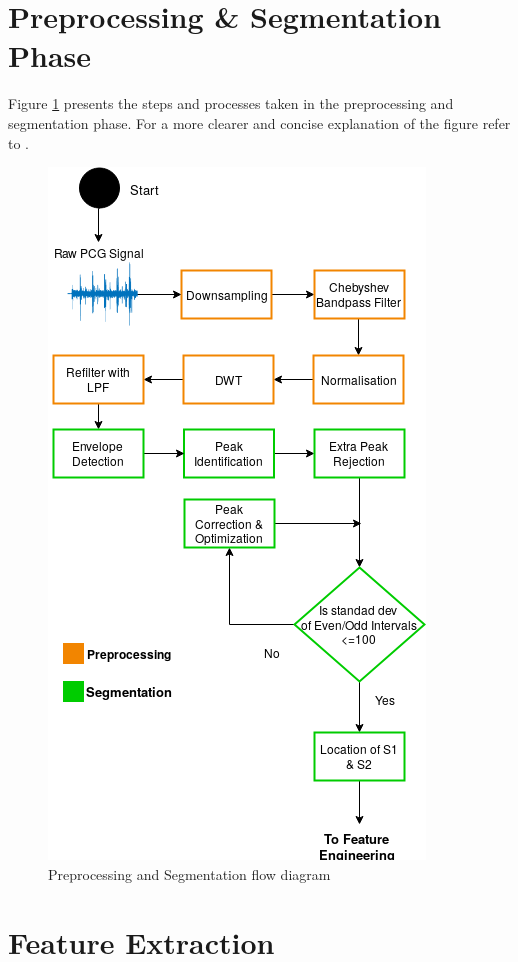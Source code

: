 \documentclass[10pt,twocolumn]{witseiepaper}
\begin{document}
\section{Preprocessing \& Segmentation Phase}
\label{app:preseg}
Figure \ref{fig:preseg} presents the steps and processes taken in the preprocessing and segmentation phase. For a more clearer and concise explanation of the figure refer to \cite{love}.
\begin{figure}[h!]
    \centering
    \includegraphics[scale=0.45]{./reportFDfinal.png}
    \caption{Preprocessing and Segmentation flow diagram}
    \label{fig:preseg}
\end{figure}{}

\section{Feature Extraction}
\label{app:features}
\end{document}
